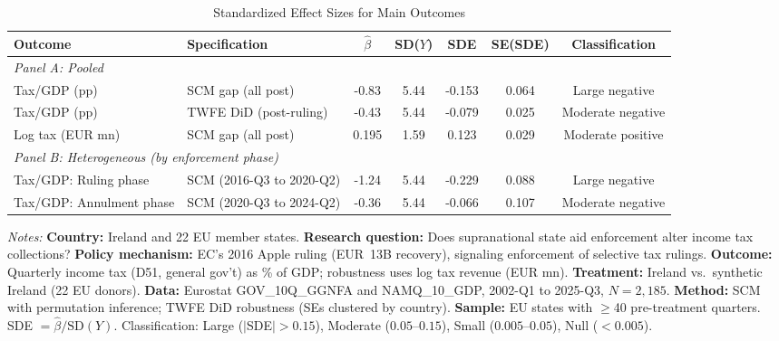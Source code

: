 \begin{table}[H]
\centering
\caption{Standardized Effect Sizes for Main Outcomes}
\label{tab:sde}
\begin{threeparttable}
\begin{adjustbox}{max width=\textwidth}
\begin{tabular}{llccccc}
\toprule
Outcome & Specification & $\hat{\beta}$ & SD($Y$) & SDE & SE(SDE) & Classification \\
\midrule
\multicolumn{7}{l}{\textit{Panel A: Pooled}} \\
    Tax/GDP (pp) & SCM gap (all post) & -0.83 & 5.44 & -0.153 & 0.064 & Large negative \\
    Tax/GDP (pp) & TWFE DiD (post-ruling) & -0.43 & 5.44 & -0.079 & 0.025 & Moderate negative \\
    Log tax (EUR mn) & SCM gap (all post) & 0.195 & 1.59 & 0.123 & 0.029 & Moderate positive \\
\midrule
\multicolumn{7}{l}{\textit{Panel B: Heterogeneous (by enforcement phase)}} \\
    Tax/GDP: Ruling phase & SCM (2016-Q3 to 2020-Q2) & -1.24 & 5.44 & -0.229 & 0.088 & Large negative \\
    Tax/GDP: Annulment phase & SCM (2020-Q3 to 2024-Q2) & -0.36 & 5.44 & -0.066 & 0.107 & Moderate negative \\
\bottomrule
\end{tabular}
\end{adjustbox}
\end{threeparttable}
\vspace{0.5em}
\begin{minipage}{\textwidth}
\footnotesize
\textit{Notes:} \textbf{Country:} Ireland and 22 EU member states. \textbf{Research question:} Does supranational state aid enforcement alter income tax collections? \textbf{Policy mechanism:} EC's 2016 Apple ruling (EUR~13B recovery), signaling enforcement of selective tax rulings. \textbf{Outcome:} Quarterly income tax (D51, general gov't) as \% of GDP; robustness uses log tax revenue (EUR mn). \textbf{Treatment:} Ireland vs.\ synthetic Ireland (22 EU donors). \textbf{Data:} Eurostat GOV\_10Q\_GGNFA and NAMQ\_10\_GDP, 2002-Q1 to 2025-Q3, $N = 2{,}185$. \textbf{Method:} SCM with permutation inference; TWFE DiD robustness (SEs clustered by country). \textbf{Sample:} EU states with $\geq$40 pre-treatment quarters. SDE $= \hat{\beta} / \text{SD}(Y)$. Classification: Large ($|$SDE$| > 0.15$), Moderate ($0.05$--$0.15$), Small ($0.005$--$0.05$), Null ($< 0.005$).
\end{minipage}
\end{table}
